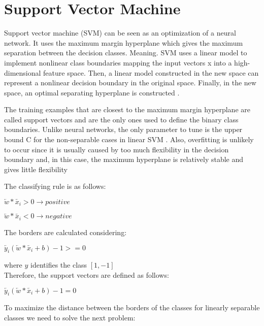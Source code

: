 
\section{Support Vector Machine}
Support vector machine (SVM) can be seen as an optimization of a neural network. It uses the maximum margin hyperplane which gives the maximum separation between the decision classes. Meaning. SVM uses a linear model to implement nonlinear class boundaries mapping the input vectors x into a high-dimensional feature space. Then, a linear model constructed in the new space can represent a nonlinear decision boundary in the original space. Finally, in the new space, an optimal separating hyperplane is constructed \cite{kim2003financial}. 

The training examples that are closest to the maximum margin hyperplane are called support vectors and are the only ones used to define the binary class boundaries. Unlike neural networks, the only parameter to tune is the upper bound C for the non-separable cases in linear SVM \cite{drucker1999support}. Also, overfitting is unlikely to occur since it is usually caused by too much flexibility in the decision boundary and, in this case, the maximum hyperplane is relatively stable and gives little flexibility \cite{zhang1998forecasting}

The classifying rule is as follows:

\centerline{$\overleftarrow{w} * \overleftarrow{x_i} > 0  \rightarrow  positive $ \\}
\centerline{$\overleftarrow{w} * \overleftarrow{x_i} < 0  \rightarrow  negative $\\} 

The borders are calculated considering: \\
\centerline{ $\overleftarrow{y_i} (\overleftarrow{w}*\overleftarrow{x_i}+b)-1>=0$ \\}
where $y$ identifies the class $[1,-1]$\\

Therefore, the support vectors are defined as follows: \\
\centerline{$\overleftarrow{y_i} (\overleftarrow{w}*\overleftarrow{x_i}+b)-1=0$\\}

To maximize the distance between the borders of the classes for linearly separable classes we need to solve the next problem:

